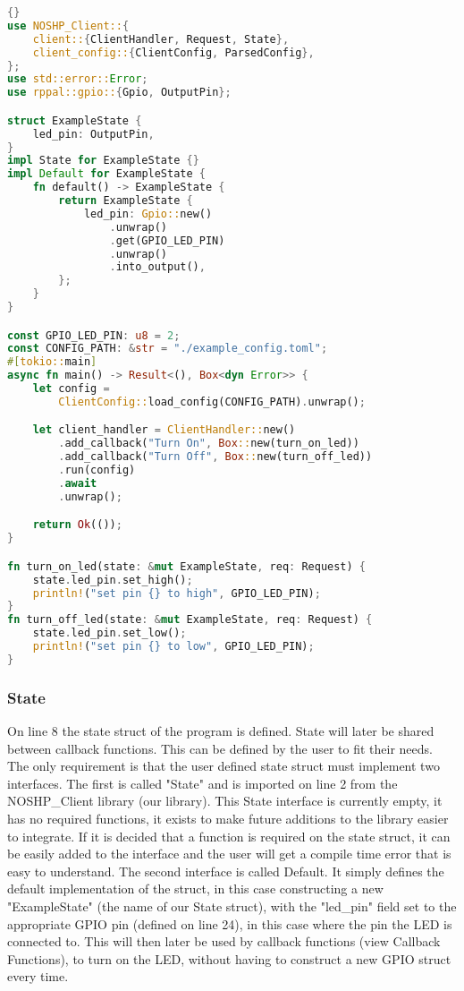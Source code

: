 \begin{lstlisting}[language=Rust, style=boxed, showstringspaces=false]{}
use NOSHP_Client::{
    client::{ClientHandler, Request, State},
    client_config::{ClientConfig, ParsedConfig},
};
use std::error::Error;
use rppal::gpio::{Gpio, OutputPin};

struct ExampleState {
    led_pin: OutputPin,
}
impl State for ExampleState {}
impl Default for ExampleState {
    fn default() -> ExampleState {
        return ExampleState {
            led_pin: Gpio::new()
                .unwrap()
                .get(GPIO_LED_PIN)
                .unwrap()
                .into_output(),
        };
    }
}

const GPIO_LED_PIN: u8 = 2;
const CONFIG_PATH: &str = "./example_config.toml";
#[tokio::main]
async fn main() -> Result<(), Box<dyn Error>> {
    let config = 
        ClientConfig::load_config(CONFIG_PATH).unwrap();

    let client_handler = ClientHandler::new()
        .add_callback("Turn On", Box::new(turn_on_led))
        .add_callback("Turn Off", Box::new(turn_off_led))
        .run(config)
        .await
        .unwrap();

    return Ok(());
}

fn turn_on_led(state: &mut ExampleState, req: Request) {
    state.led_pin.set_high();
    println!("set pin {} to high", GPIO_LED_PIN);
}
fn turn_off_led(state: &mut ExampleState, req: Request) {
    state.led_pin.set_low();
    println!("set pin {} to low", GPIO_LED_PIN);
}
\end{lstlisting}

\subsubsection{State}
On line 8 the state struct of the program is defined. State will later be shared between callback functions. This can be defined by the user to fit their needs. The only requirement is that the user defined state struct must implement two interfaces. The first is called "State" and is imported on line 2 from the NOSHP\_Client library (our library). This State interface is currently empty, it has no required functions, it exists to make future additions to the library easier to integrate. If it is decided that a function is required on the state struct, it can be easily added to the interface and the user will get a compile time error that is easy to understand. The second interface is called Default. It simply defines the default implementation of the struct, in this case constructing a new "ExampleState" (the name of our State struct), with the "led\_pin" field set to the appropriate GPIO pin (defined on line 24), in this case where the pin the LED is connected to. This will then later be used by callback functions (view Callback Functions), to turn on the LED, without having to construct a new GPIO struct every time.

